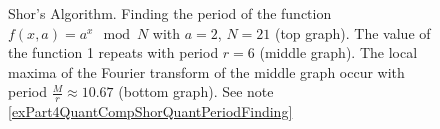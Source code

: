 \begin{figure}
\centering








\caption{Shor's Algorithm. Finding the period of the function 
  $f\left(x, a\right) = a^x \mod{N}$ with $a=2$, $N = 21$ (top graph). 
  The value of the function 1 repeats with period $r=6$ (middle graph). 
  The local maxima of the Fourier transform of the middle graph 
  occur with period $\frac{M}{r} \approx 10.67$ (bottom graph). See
  note \ref{exPart4QuantCompShorQuantPeriodFinding}}
\label{picPart4QuantCompShorQuantPart}
\end{figure}